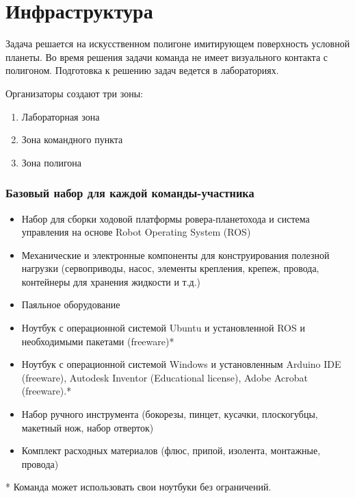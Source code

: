 \section{Инфраструктура}

Задача решается на искусственном полигоне имитирующем поверхность условной планеты. Во время решения задачи команда не имеет визуального контакта с полигоном. Подготовка к решению задач ведется в лабораториях.

Организаторы создают три зоны: 

\begin{enumerate}
    \item Лабораторная зона
    \item Зона командного пункта
    \item Зона полигона
\end{enumerate}

\subsubsection*{Базовый набор для каждой команды-участника}
\begin{itemize}
    \item Набор для сборки ходовой платформы ровера-планетохода и система управления на основе  Robot Operating System (ROS)
    \item Механические и электронные компоненты для конструирования полезной нагрузки (сервоприводы, насос, элементы крепления, крепеж, провода, контейнеры для хранения жидкости и т.д.)
    \item Паяльное оборудование
    \item Ноутбук с операционной системой Ubuntu и установленной ROS и необходимыми пакетами (freeware)*
    \item Ноутбук с операционной системой Windows и установленным Arduino IDE (freeware), Autodesk Inventor (Educational license), Adobe Acrobat (freeware).*
    \item Набор ручного инструмента (бокорезы, пинцет, кусачки, плоскогубцы, макетный нож, набор отверток)
    \item Комплект расходных материалов (флюс, припой, изолента, монтажные, провода)
\end{itemize}

* Команда может использовать свои ноутбуки без ограничений.

